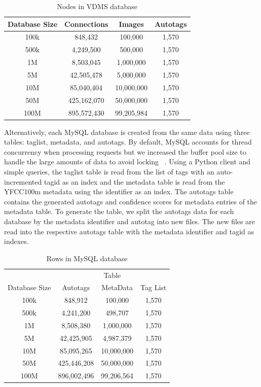 \begin{table}[h]
\caption{Nodes in VDMS database}
\centering
\begin{tabular}{c c c c}
\hline\hline
Database Size & Connections & Images & Autotags\\
\hline
100k & 848,432      & 100,000     & 1,570\\
500k & 4,249,500    & 500,000     & 1,570\\
1M   & 8,503,045    & 1,000,000   & 1,570\\
5M   & 42,505,478   & 5,000,000   & 1,570\\
10M  & 85,040,404   & 10,000,000  & 1,570\\
50M  & 425,162,070  & 50,000,000  & 1,570\\
100M & 895,572,430  & 99,205,984  & 1,570\\
\hline
\end{tabular}
\label{table:vdmsnodes}
\end{table}

Alternatively, each MySQL database is created from the same data using three tables: taglist, metadata, and autotags.  By default, MySQL accounts for thread concurrency when processing requests but we increased the buffer pool size to handle the large amounts of data to avoid locking ~\cite{mysql}. Using a Python client and simple queries, the taglist table is read from the list of tags with an auto-incremented tagid as an index and the metadata table is read from the YFCC100m metadata using the identifier as an index. The autotags table contains the generated autotags and confidence scores for metadata entries of the metadata table. To generate the table, we split the autotags data for each database by the metadata identifier and autotag into new files. The new files are read into the respective autotags table with the metadata identifier and tagid as indexes.

\begin{table}[h]
\caption{Rows in MySQL database}
\centering
\begin{tabular}{c c c c}
\hline\hline
 & \multicolumn{3}{c}{Table}\\
\cline{2-4}
Database Size & Autotags & MetaData & Tag List\\
\hline
100k & 848,912     & 100,000    & 1,570\\
500k & 4,241,200   & 498,707    & 1,570\\
1M   & 8,508,380   & 1,000,000  & 1,570\\
5M   & 42,425,905  & 4,987,379  & 1,570\\
10M  & 85,095,265  & 10,000,000 & 1,570\\
50M  & 425,446,208 & 50,000,000 & 1,570\\
100M & 896,002,496 & 99,206,564 & 1,570\\
\hline
\end{tabular}
\label{table:mysqltables}
\end{table}

